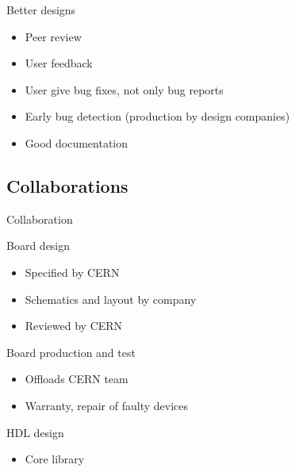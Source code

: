 \documentclass[compress,red]{beamer}
\begin{document}

\begin{frame}{Better designs}

  \begin{block}{}
    \begin{itemize}
    \item Peer review
    \item User feedback
    \item User give bug fixes, not only bug reports
    \item Early bug detection (production by design companies)
    \item Good documentation
    \end{itemize}
  \end{block}

\end{frame}

\subsection{Collaborations}

\begin{frame}{Collaboration}

  \begin{block}{Board design}
    \begin{itemize}
    \item Specified by CERN
    \item Schematics and layout by company
    \item Reviewed by CERN
    \end{itemize}
  \end{block}

  \begin{block}{Board production and test}
    \begin{itemize}
    \item Offloads CERN team
    \item Warranty, repair of faulty devices
    \end{itemize}
  \end{block}

  \begin{block}{HDL design}
    \begin{itemize}
    \item Core library
    \end{itemize}
  \end{block}


\end{frame}
\end{document}
